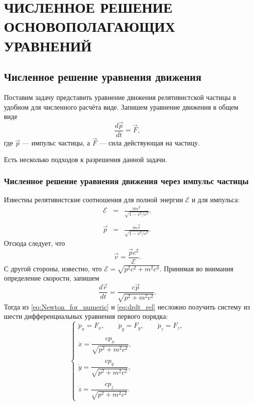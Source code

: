 \chapter{ЧИСЛЕННОЕ РЕШЕНИЕ ОСНОВОПОЛАГАЮЩИХ УРАВНЕНИЙ} \label{ch3}

\section{Численное решение уравнения движения}

Поставим задачу представить уравнение движения релятивистской частицы в удобном для численного расчёта виде. Запишем уравнение движения в общем виде
\begin{equation}
\frac{d \vec{p}}{dt} = \vec{F},
\label{eq:Newton_for_numeric}
\end{equation}
где $\vec{p}$ --- импульс частицы, а $\vec{F}$ --- сила действующая на частицу. 

Есть несколько подходов к разрешения данной задачи.

\subsection{Численное решение уравнения движения через импульс частицы}


Известны релятивистские соотношения для полной энергии $\mathscr{E}$ и для импульса:
\begin{eqnarray*}
	\mathscr{E} &=& \frac{mc^2}{\sqrt{1 - v^2/c^2}},\\ \nonumber \\
	\vec{p} &=& \frac{m\vec{v}}{\sqrt{1 - v^2/c^2}}.
\end{eqnarray*}
Отсюда следует, что
\begin{equation}
	\vec{v} = \frac{\vec{p}c^2}{\mathscr{E}}.
\end{equation}
С другой стороны, известно, что $\mathscr{E} = \sqrt{p^2c^2 + m^2 c^4}$.
Принимая во внимания определение скорости, запишем
\begin{equation}
	\frac{d\vec{r}}{dt} = \frac{c \vec{p}}{\sqrt{p^2 + m^2 c^2}}.
	\label{eq:drdt_rel}
\end{equation}
Тогда из \eqref{eq:Newton_for_numeric} и \eqref{eq:drdt_rel} несложно получить систему из шести дифференциальных уравнения первого порядка:
\begin{equation}
	\begin{cases}
	\dot{p}_x = F_x, \qquad \dot{p}_y = F_y, \qquad \dot{p}_z = F_z, \\ \\
	\dot{x} = \dfrac{c p_x}{\sqrt{p^2 + m^2 c^2}}, \\ \\
	\dot{y} = \dfrac{c p_y}{\sqrt{p^2 + m^2 c^2}}, \\ \\
	\dot{z} = \dfrac{c p_z}{\sqrt{p^2 + m^2 c^2}}.
	\end{cases}
	\label{eq:style1}
\end{equation}

